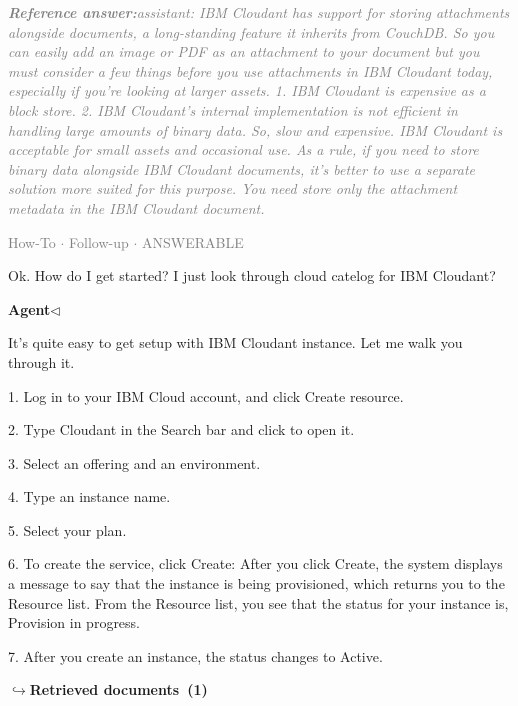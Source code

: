 \documentclass[a4paper,11pt]{article}
\begin{document}
\begin{refanswerenv}
{\footnotesize\textit{\textcolor{gray}{\textbf{Reference answer:}\enspace assistant: IBM Cloudant has support for storing attachments alongside documents, a long-standing feature it inherits from CouchDB. So you can easily add an image or PDF as an attachment to your document but you must consider a few things before you use attachments in IBM Cloudant today, especially if you’re looking at larger assets. 1. IBM Cloudant is expensive as a block store. 2. IBM Cloudant’s internal implementation is not efficient in handling large amounts of binary data. So, slow and expensive. IBM Cloudant is acceptable for small assets and occasional use. As a rule, if you need to store binary data alongside IBM Cloudant documents, it’s better to use a separate solution more suited for this purpose. You need store only the attachment metadata in the IBM Cloudant document.}}}
\end{refanswerenv}
\vspace{0.5em}
\hfill{\tiny\textcolor{gray}{How-To $\cdot$ Follow-up $\cdot$ ANSWERABLE}}
\begin{userbubble}
Ok. How do I get started? I just look through cloud catelog for IBM Cloudant? 
\end{userbubble}
\noindent\hfill{\small\textcolor{agentcolor}{\textbf{Agent\enspace$\triangleleft$}}}
\begin{agentbubble}
It's quite easy to get setup with IBM Cloudant instance. Let me walk you through it.

1. Log in to your IBM Cloud account, and click Create resource. 

2. Type Cloudant in the Search bar and click to open it. 

3. Select an offering and an environment. 

4. Type an instance name. 

5. Select your plan. 

6. To create the service, click Create:
After you click Create, the system displays a message to say that the instance is being provisioned, which returns you to the Resource list. From the Resource list, you see that the status for your instance is, Provision in progress. 

7. After you create an instance, the status changes to Active.  
\end{agentbubble}
\noindent\hfill{\footnotesize\textcolor{doccolor}{\textbf{$\hookrightarrow$\enspace Retrieved documents~(1)}}}
\end{document}
